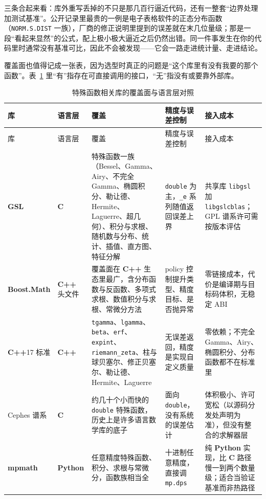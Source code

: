 \documentclass[12pt,a4paper,fontset=fandol]{ctexbook}
\newcommand{\Tp}[1]{\texttt{#1}}
\newcommand{\Bk}{\allowbreak}
\newcommand{\Lib}[1]{\textbf{#1}}
\newcommand{\Lang}[1]{\textsf{\bfseries #1}}
\newcommand{\CL}{\Lang{C}}
\newcommand{\CPP}{\Lang{C++}}
\newcommand{\PY}{\Lang{Python}}
\begin{document}
三条合起来看：库外重写丢掉的不只是那几百行逼近代码，还有一整套``边界处理加测试基准''。公开记录里最贵的一例是电子表格软件的正态分布函数（\Tp{NORM.S.DIST} 一族），厂商的修正说明里提到的误差就在末几位量级；那是一段``看起来显然''的公式，配上极小极大逼近之后仍然出错。同一件事发生在你的代码里时通常没有基准可比，因此不会被发现——它会一路走进统计量、走进结论。

覆盖面也值得记成一张表，因为选型时真正的问题是``这个库里有没有我要的那个函数''。表~\ref{tab:ch06-coverage} 里``有''指存在可直接调用的接口，``无''指没有或要靠外部库。

\begin{longtable}{@{}>{\raggedright\arraybackslash}p{}
  >{\raggedright\arraybackslash}p{}
  >{\raggedright\arraybackslash}p{}
  >{\raggedright\arraybackslash}p{}
  >{\raggedright\arraybackslash}p{}@{}}
\caption{特殊函数相关库的覆盖面与语言层对照}\label{tab:ch06-coverage}\\
\toprule
库 & 语言层 & 覆盖 & 精度与误差控制 & 接入成本 \\
\midrule
\endfirsthead
\toprule
库 & 语言层 & 覆盖 & 精度与误差控制 & 接入成本 \\
\midrule
\endhead
\Lib{GSL} & \CL{} &
  特殊函数一族（Bessel、Gamma、Airy、不完全 Gamma、椭圆积分、勒让德、Hermite、Laguerre、超几何）、积分与求根、随机数与分布、统计、插值、直方图、特征分解 &
  \Tp{double} 为主，\Tp{\_e} 系列随值返回误差上界 &
  共享库 \Tp{libgsl} 加 \Tp{libgslcblas}；GPL 谱系许可需按版本评估 \\
\Lib{Boost\Bk.Math} & \CPP{} 头文件 &
  覆盖面在 \CPP{} 生态里最广，含分布函数与反函数、多项式求根、数值积分与求根、常微分方法 &
  policy 控制提升类型、精度目标、是否抛异常 &
  零链接成本，代价是编译期与目标码体积，无稳定 ABI \\
\CPP{}17 标准 & \CPP{} &
  \Tp{tgamma}、\Tp{lgamma}、\Tp{beta}、\Tp{erf}、\Tp{expint}、\Tp{riemann\_zeta}、柱与球贝塞尔、修正贝塞尔、勒让德、Hermite、Laguerre &
  无误差返回，精度是实现自定义质量 &
  零依赖；不完全 Gamma、Airy、椭圆积分、分布函数都不在标准里 \\
Cephes 谱系 & \CL{} &
  约几十个小而快的 \Tp{double} 特殊函数，历史上是许多语言数学库的底子 &
  面向 \Tp{double}，没有系统的误差估计 &
  体积极小、许可宽松（以源码分发处声明为准），但没有整合的求解器层 \\
\Lib{mpmath} & \PY{} &
  任意精度特殊函数、积分、求根与常微分，函数族相当全 &
  十进制任意精度，直接调 \Tp{mp.dps} &
  纯 \PY{} 实现，比 \CL{} 路径慢一到两个数量级；适合当验证基准而非热路径 \\
\bottomrule
\end{longtable}
\end{document}
